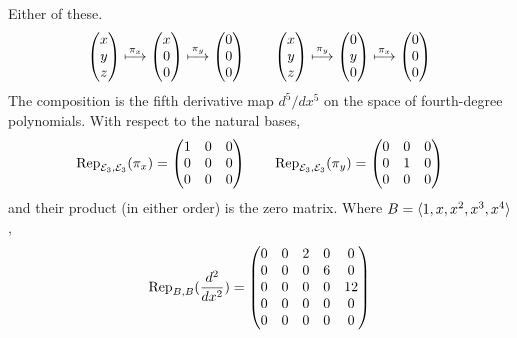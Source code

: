 \begin{exercises}
\begin{answer}
\begin{exparts}
        \partsitem Either of these.
          \begin{equation*}
            \colvec{x \\ y \\ z}
              \mapsunder{\pi_x}
            \colvec{x \\ 0 \\ 0}
              \mapsunder{\pi_y}
            \colvec{0 \\ 0 \\ 0}
            \qquad
            \colvec{x \\ y \\ z}
              \mapsunder{\pi_y}
            \colvec{0 \\ y \\ 0}
              \mapsunder{\pi_x}
            \colvec{0 \\ 0 \\ 0}
          \end{equation*}
        \partsitem The composition is the fifth derivative map
          $d^5/dx^5$ on the space of fourth-degree polynomials.
        \partsitem With respect to the natural bases,
          \begin{equation*}
            \rep{\pi_x}{\stdbasis_3,\stdbasis_3}=\begin{pmatrix}
              1  &0  &0  \\
              0  &0  &0  \\
              0  &0  &0
            \end{pmatrix}
            \qquad
            \rep{\pi_y}{\stdbasis_3,\stdbasis_3}=\begin{pmatrix}
              0  &0  &0  \\
              0  &1  &0  \\
              0  &0  &0
            \end{pmatrix}
          \end{equation*}
          and their product (in either order) is the zero matrix.
        \partsitem Where \( B=\sequence{1,x,x^2,x^3,x^4} \),
          \begin{equation*}
            \rep{\frac{d^2}{dx^2}}{B,B}=\begin{pmatrix}
              0  &0  &2  &0  &0  \\
              0  &0  &0  &6  &0  \\
              0  &0  &0  &0  &12 \\
              0  &0  &0  &0  &0  \\
              0  &0  &0  &0  &0

\end{pmatrix}
\end{equation*}
\end{exparts}
\end{answer}
\end{exercises}
